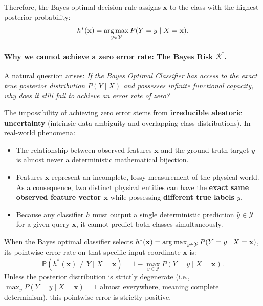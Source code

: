 Therefore, the Bayes optimal decision rule assigns $\mathbf{x}$ to the class with the highest posterior probability:
\begin{equation}
h^*(\mathbf{x}) = \operatorname*{arg\,max}_{y \in \mathcal{Y}} P(Y = y \mid X = \mathbf{x}).
\label{eq:bayes_optimal_classifier_pointwise}
\end{equation}

\paragraph{Why we cannot achieve a zero error rate: The Bayes Risk $\mathcal{R}^*$.}
A natural question arises: \emph{If the Bayes Optimal Classifier has access to the exact true posterior distribution $P(Y \mid X)$ and possesses infinite functional capacity, why does it still fail to achieve an error rate of zero?}

The impossibility of achieving zero error stems from \textbf{irreducible aleatoric uncertainty} (intrinsic data ambiguity and overlapping class distributions). In real-world phenomena:
\begin{itemize}[noitemsep]
  \item The relationship between observed features $\mathbf{x}$ and the ground-truth target $y$ is almost never a deterministic mathematical bijection.
  \item Features $\mathbf{x}$ represent an incomplete, lossy measurement of the physical world. As a consequence, two distinct physical entities can have the \textbf{exact same observed feature vector $\mathbf{x}$} while possessing \textbf{different true labels $y$}.
  \item Because any classifier $h$ must output a single deterministic prediction $\hat{y} \in \mathcal{Y}$ for a given query $\mathbf{x}$, it cannot predict both classes simultaneously.
\end{itemize}

When the Bayes optimal classifier selects $h^*(\mathbf{x}) = \operatorname*{arg\,max}_{y \in \mathcal{Y}} P(Y = y \mid X = \mathbf{x})$, its pointwise error rate on that specific input coordinate $\mathbf{x}$ is:
\begin{equation}
\mathbb{P}(h^*(\mathbf{x}) \neq Y \mid X = \mathbf{x}) = 1 - \max_{y \in \mathcal{Y}} P(Y = y \mid X = \mathbf{x}).
\end{equation}
Unless the posterior distribution is strictly degenerate (i.e., $\max_{y} P(Y = y \mid X = \mathbf{x}) = 1$ almost everywhere, meaning complete determinism), this pointwise error is strictly positive.

